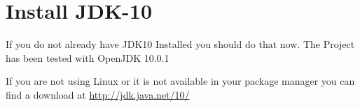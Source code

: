 \section{Install JDK-10}

If you do not already have JDK10 Installed you should do that now.
The Project has been tested with OpenJDK 10.0.1

If you are not using Linux or it is not available in your package manager
you can find a download at \url{http://jdk.java.net/10/}
